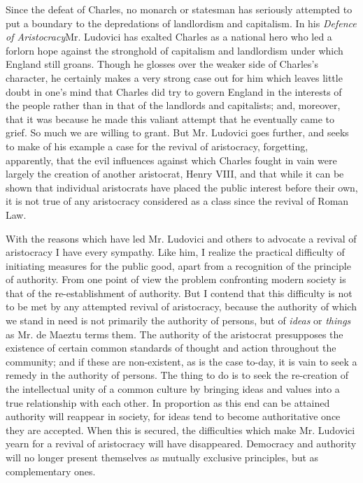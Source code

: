 \documentclass{book}
\begin{document}
Since the defeat of Charles, no monarch or statesman has seriously attempted to put a boundary to the depredations of landlordism and capitalism. In his \emph{Defence of Aristocracy}\footnotemark[7] Mr. Ludovici has exalted Charles as a national hero who led a forlorn hope against the stronghold of capitalism and landlordism under which England still groans. Though he glosses over the weaker side of Charles’s character, he certainly makes a very strong case out for him which leaves little doubt in one’s mind that Charles did try to govern England in the interests of the people rather than in that of the landlords and capitalists; and, moreover, that it was because he made this valiant attempt that he eventually came to grief. So much we are willing to grant. But Mr. Ludovici goes further, and seeks to make of his example a case for the revival of aristocracy, forgetting, apparently, that the evil influences against which Charles fought in vain were largely the creation of another aristocrat, Henry VIII, and that while it can be shown that individual aristocrats have placed the public interest before their own, it is not true of any aristocracy considered as a class since the revival of Roman Law.

With the reasons which have led Mr. Ludovici and others to advocate a revival of aristocracy I have every sympathy. Like him, I realize the practical difficulty of initiating measures for the public good, apart from a recognition of the principle of authority. From one point of view the problem confronting modern society is that of the re-establishment of authority. But I contend that this difficulty is not to be met by any attempted revival of aristocracy, because the authority of which we stand in need is not primarily the authority of persons, but of \emph{ideas} or \emph{things} as Mr. de Maeztu terms them. The authority of the aristocrat presupposes the existence of certain common standards of thought and action throughout the community; and if these are non-existent, as is the case to-day, it is vain to seek a remedy in the authority of persons. The thing to do is to seek the re-creation of the intellectual unity of a common culture by bringing ideas and values into a true relationship with each other. In proportion as this end can be attained authority will reappear in society, for ideas tend to become authoritative once they are accepted. When this is secured, the difficulties which make Mr. Ludovici yearn for a revival of aristocracy will have disappeared. Democracy and authority will no longer present themselves as mutually exclusive principles, but as complementary ones.
\end{document}
